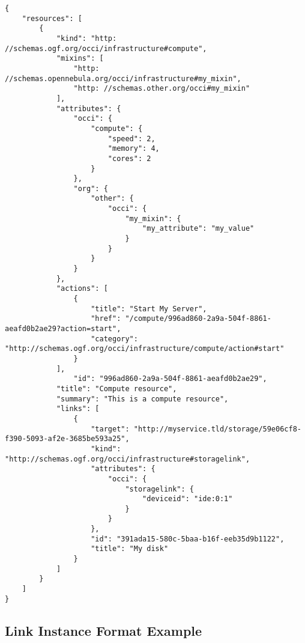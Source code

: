 \documentclass[10pt,a4paper]{article}
\begin{document}
\begin{verbatim}
{
    "resources": [
        {
            "kind": "http: //schemas.ogf.org/occi/infrastructure#compute",
            "mixins": [
                "http: //schemas.opennebula.org/occi/infrastructure#my_mixin",
                "http: //schemas.other.org/occi#my_mixin"
            ],
            "attributes": {
                "occi": {
                    "compute": {
                        "speed": 2,
                        "memory": 4,
                        "cores": 2
                    }
                },
                "org": {
                    "other": {
                        "occi": {
                            "my_mixin": {
                                "my_attribute": "my_value"
                            }
                        }
                    }
                }
            },
            "actions": [
                {
                    "title": "Start My Server",
                    "href": "/compute/996ad860-2a9a-504f-8861-aeafd0b2ae29?action=start",
                    "category": "http://schemas.ogf.org/occi/infrastructure/compute/action#start"
                }
            ],
            	"id": "996ad860-2a9a-504f-8861-aeafd0b2ae29",
		    "title": "Compute resource",
		    "summary": "This is a compute resource",
		    "links": [
		        {
		            "target": "http://myservice.tld/storage/59e06cf8-f390-5093-af2e-3685be593a25",
		            "kind": "http://schemas.ogf.org/occi/infrastructure#storagelink",
		            "attributes": {
		                "occi": {
		                    "storagelink": {
		                        "deviceid": "ide:0:1"
		                    }
		                }
		            },
		            "id": "391ada15-580c-5baa-b16f-eeb35d9b1122",
		            "title": "My disk"
		        }
		    ]
        }
    ]
}
\end{verbatim}

\subsection{Link Instance Format Example}
\label{sec:example_link}
\end{document}
